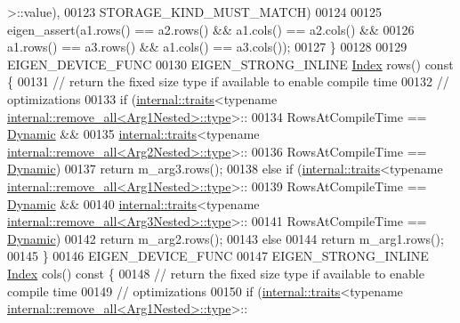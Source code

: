 \begin{DoxyCode}
      >::value),
00123                         STORAGE\_KIND\_MUST\_MATCH)
00124 
00125     eigen\_assert(a1.rows() == a2.rows() && a1.cols() == a2.cols() &&
00126                  a1.rows() == a3.rows() && a1.cols() == a3.cols());
00127   \}
00128 
00129   EIGEN\_DEVICE\_FUNC
00130   EIGEN\_STRONG\_INLINE \hyperlink{namespace_eigen_a62e77e0933482dafde8fe197d9a2cfde}{Index} rows()\textcolor{keyword}{ const }\{
00131     \textcolor{comment}{// return the fixed size type if available to enable compile time}
00132     \textcolor{comment}{// optimizations}
00133     \textcolor{keywordflow}{if} (\hyperlink{struct_eigen_1_1internal_1_1traits}{internal::traits}<\textcolor{keyword}{typename} 
      \hyperlink{group___sparse_core___module}{internal::remove\_all<Arg1Nested>::type}>::
00134                 RowsAtCompileTime == \hyperlink{namespace_eigen_ad81fa7195215a0ce30017dfac309f0b2}{Dynamic} &&
00135         \hyperlink{struct_eigen_1_1internal_1_1traits}{internal::traits}<\textcolor{keyword}{typename} 
      \hyperlink{group___sparse_core___module}{internal::remove\_all<Arg2Nested>::type}>::
00136                 RowsAtCompileTime == \hyperlink{namespace_eigen_ad81fa7195215a0ce30017dfac309f0b2}{Dynamic})
00137       \textcolor{keywordflow}{return} m\_arg3.rows();
00138     \textcolor{keywordflow}{else} \textcolor{keywordflow}{if} (\hyperlink{struct_eigen_1_1internal_1_1traits}{internal::traits}<\textcolor{keyword}{typename} 
      \hyperlink{group___sparse_core___module}{internal::remove\_all<Arg1Nested>::type}>::
00139                      RowsAtCompileTime == \hyperlink{namespace_eigen_ad81fa7195215a0ce30017dfac309f0b2}{Dynamic} &&
00140              \hyperlink{struct_eigen_1_1internal_1_1traits}{internal::traits}<\textcolor{keyword}{typename} 
      \hyperlink{group___sparse_core___module}{internal::remove\_all<Arg3Nested>::type}>::
00141                      RowsAtCompileTime == \hyperlink{namespace_eigen_ad81fa7195215a0ce30017dfac309f0b2}{Dynamic})
00142       \textcolor{keywordflow}{return} m\_arg2.rows();
00143     \textcolor{keywordflow}{else}
00144       \textcolor{keywordflow}{return} m\_arg1.rows();
00145   \}
00146   EIGEN\_DEVICE\_FUNC
00147   EIGEN\_STRONG\_INLINE \hyperlink{namespace_eigen_a62e77e0933482dafde8fe197d9a2cfde}{Index} cols()\textcolor{keyword}{ const }\{
00148     \textcolor{comment}{// return the fixed size type if available to enable compile time}
00149     \textcolor{comment}{// optimizations}
00150     \textcolor{keywordflow}{if} (\hyperlink{struct_eigen_1_1internal_1_1traits}{internal::traits}<\textcolor{keyword}{typename} 
      \hyperlink{group___sparse_core___module}{internal::remove\_all<Arg1Nested>::type}>::

\end{DoxyCode}
